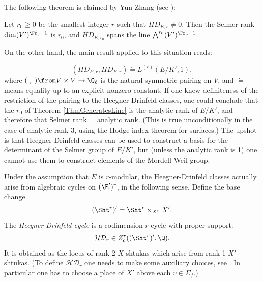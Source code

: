 \documentclass{article}
\begin{document}
The following theorem is claimed by Yun-Zhang (see \cite[Section 1.3.1]{YunZhangShtukasII}):

\begin{thm} \label{ThmGeneratesLine} Let $r_0\geq 0$ be the smallest integer $r$ such that $HD_{E,r}\neq 0$.  Then the Selmer rank $\dim (V')^{\Fr_q=1}$ is $r_0$, and $HD_{E,r_0}$ spans the line $\bigwedge^{r_0} (V')^{\Fr_q=1}$.  
\end{thm}


On the other hand,  the main result \cite[Corollary 1.4]{YunZhangShtukasII} applied to this situation reads:

\begin{equation}
\label{EqSelfIntersectionOfHD}
 (HD_{E,r},HD_{E,r}) \dot{=} L^{(r)}(E/K',1), 
 \end{equation}
where $(\;,\;)\from V\times V\to\Q_\ell$ is the natural symmetric pairing on $V$, and $\dot{=}$ means equality up to an explicit nonzero constant.   If one knew definiteness of the restriction of the pairing to the Heegner-Drinfeld classes, one could conclude that the $r_0$ of Theorem \ref{ThmGeneratesLine} is the analytic rank of $E/K'$, and therefore that Selmer rank = analytic rank.   (This is true unconditionally in the case of analytic rank 3, using the Hodge index theorem for surfaces.) The upshot is that Heegner-Drinfeld classes can be used to construct a basis for the determinant of the Selmer group of $E/K'$, but (unless the analytic rank is 1) one cannot use them to construct elements of the Mordell-Weil group.

Under the assumption that $E$ is $r$-modular, the Heegner-Drinfeld classes actually arise from algebraic cycles on $(\E')^r$, in the following sense.  Define the base change
\[ (\Sht^r)'=\Sht^r \times_{X^r} X'. \]
The {\em Heegner-Drinfeld cycle} is a codimension $r$ cycle with proper support:
\[ \mathcal{HD}_r\in Z^r_c((\Sht^r)',\Q). \]
It is obtained as the locus of rank 2 $X$-shtukas which arise from rank 1 $X'$-shtukas.  (To define $\mathcal{HD}_r$ one needs to make some auxiliary choices, see \cite[1.1.3]{YunZhangShtukasII}.  In particular one has to choose a place of $X'$ above each $v\in\Sigma_{f}$.)
\end{document}
